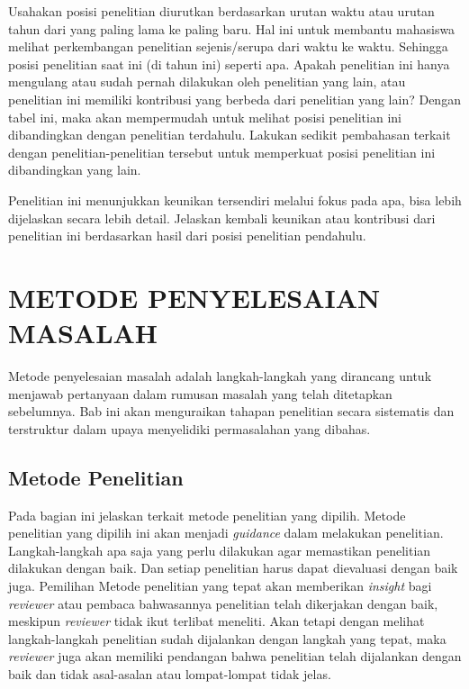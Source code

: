 Usahakan posisi penelitian diurutkan berdasarkan urutan waktu atau
urutan tahun dari yang paling lama ke paling baru. Hal ini untuk
membantu mahasiswa melihat perkembangan penelitian sejenis/serupa dari
waktu ke waktu. Sehingga posisi penelitian saat ini (di tahun ini)
seperti apa. Apakah penelitian ini hanya mengulang atau sudah pernah
dilakukan oleh penelitian yang lain, atau penelitian ini memiliki
kontribusi yang berbeda dari penelitian yang lain? Dengan tabel ini,
maka akan mempermudah untuk melihat posisi penelitian ini dibandingkan
dengan penelitian terdahulu. Lakukan sedikit pembahasan terkait dengan
penelitian-penelitian tersebut untuk memperkuat posisi penelitian ini
dibandingkan yang lain.

Penelitian ini menunjukkan keunikan tersendiri melalui fokus pada apa,
bisa lebih dijelaskan secara lebih detail. Jelaskan kembali keunikan
atau kontribusi dari penelitian ini berdasarkan hasil dari posisi
penelitian pendahulu.

\hypertarget{metode-penyelesaian-masalah}{%
\section{METODE PENYELESAIAN
MASALAH}\label{metode-penyelesaian-masalah}}

Metode penyelesaian masalah adalah langkah-langkah yang dirancang untuk
menjawab pertanyaan dalam rumusan masalah yang telah ditetapkan
sebelumnya. Bab ini akan menguraikan tahapan penelitian secara
sistematis dan terstruktur dalam upaya menyelidiki permasalahan yang
dibahas.

\hypertarget{metode-penelitian}{%
\subsection{Metode Penelitian}\label{metode-penelitian}}

Pada bagian ini jelaskan terkait metode penelitian yang dipilih. Metode
penelitian yang dipilih ini akan menjadi \emph{guidance} dalam melakukan
penelitian. Langkah-langkah apa saja yang perlu dilakukan agar
memastikan penelitian dilakukan dengan baik. Dan setiap penelitian harus
dapat dievaluasi dengan baik juga. Pemilihan Metode penelitian yang
tepat akan memberikan \emph{insight} bagi \emph{reviewer} atau pembaca
bahwasannya penelitian telah dikerjakan dengan baik, meskipun
\emph{reviewer} tidak ikut terlibat meneliti. Akan tetapi dengan melihat
langkah-langkah penelitian sudah dijalankan dengan langkah yang tepat,
maka \emph{reviewer} juga akan memiliki pendangan bahwa penelitian telah
dijalankan dengan baik dan tidak asal-asalan atau lompat-lompat tidak
jelas.

